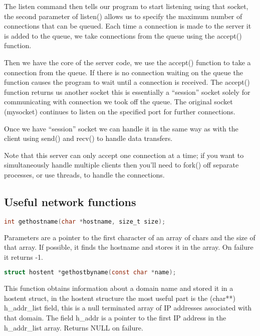The listen command then tells our program to start listening using that socket,
the second parameter of listen() allows us to specify the maximum number of
connections that can be queued. Each time a connection is made to the server it
is added to the queue, we take connections from the queue using the accept()
function.

Then we have the core of the server code, we use the accept() function to take
a connection from the queue. If there is no connection waiting on the queue the
function causes the program to wait until a connection is received. The
accept() function returns us another socket this is essentially a ``session''
socket solely for communicating with connection we took off the queue. The
original socket (mysocket) continues to listen on the specified port for
further connections.

Once we have ``session'' socket we can handle it in the same way as with the
client using send() and recv() to handle data transfers.

Note that this server can only accept one connection at a time; if you want to
simultaneously handle multiple clients then you'll need to fork() off separate
processes, or use threads, to handle the connections.

\subsection{Useful network functions}
\lstset{basicstyle=\scriptsize, numbers=left, captionpos=b, tabsize=4}
\begin{lstlisting}[caption=Section \thesection listing \arabic{netcnt},language={C},
breaklines=true,xleftmargin=15pt,label=lst:section\thesection listing\arabic{netcnt}]
int gethostname(char *hostname, size_t size);
\end{lstlisting}

Parameters are a pointer to the first character of an array of chars and the
size of that array. If possible, it finds the hostname and stores it in the
array. On failure it returns -1.
\lstset{basicstyle=\scriptsize, numbers=left, captionpos=b, tabsize=4}
\begin{lstlisting}[caption=Section \thesection listing \arabic{netcnt},language={C},
breaklines=true,xleftmargin=15pt,label=lst:section\thesection listing\arabic{netcnt}]
struct hostent *gethostbyname(const char *name);
\end{lstlisting}

This function obtains information about a domain name and stored it in a
hostent struct, in the hostent structure the most useful part is the (char**)
h\_addr\_list field, this is a null terminated array of IP addresses associated
with that domain. The field h\_addr is a pointer to the first IP address in the
h\_addr\_list array. Returns NULL on failure.

